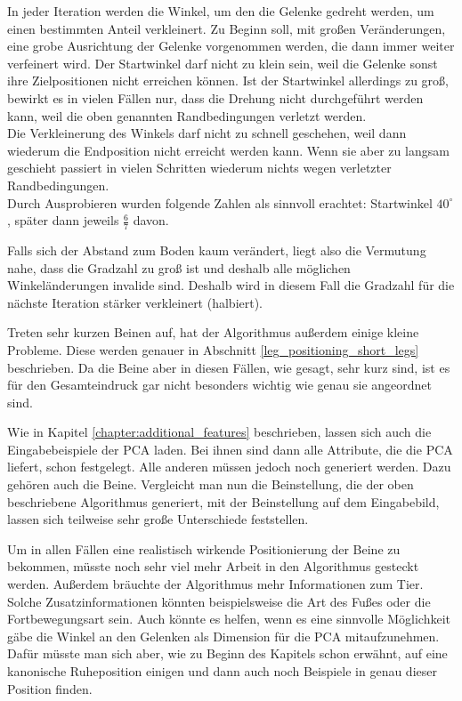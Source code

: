 In jeder Iteration werden die Winkel, um den die Gelenke gedreht werden, um einen bestimmten Anteil verkleinert. Zu Beginn soll, mit großen Veränderungen, eine grobe Ausrichtung der Gelenke vorgenommen werden, die dann immer weiter verfeinert wird.
Der Startwinkel darf nicht zu klein sein, weil die Gelenke sonst ihre Zielpositionen nicht erreichen können. Ist der Startwinkel allerdings zu groß, bewirkt es in vielen Fällen nur, dass die Drehung nicht durchgeführt werden kann, weil die oben genannten Randbedingungen verletzt werden.\\
Die Verkleinerung des Winkels darf nicht zu schnell geschehen, weil dann wiederum die Endposition nicht erreicht werden kann. Wenn sie aber zu langsam geschieht passiert in vielen Schritten wiederum nichts wegen verletzter Randbedingungen.\\
Durch Ausprobieren wurden folgende Zahlen als sinnvoll erachtet: Startwinkel $40^{\circ}$, später dann jeweils $\frac{6}{7}$ davon.

Falls sich der Abstand zum Boden kaum verändert, liegt also die Vermutung nahe, dass die Gradzahl zu groß ist und deshalb alle möglichen Winkeländerungen invalide sind. Deshalb wird in diesem Fall die Gradzahl für die nächste Iteration stärker verkleinert (halbiert).


Treten sehr kurzen Beinen auf, hat der Algorithmus außerdem einige kleine Probleme. Diese werden genauer in Abschnitt \ref{leg_positioning_short_legs} beschrieben. Da die Beine aber in diesen Fällen, wie gesagt, sehr kurz sind, ist es für den Gesamteindruck gar nicht besonders wichtig wie genau sie angeordnet sind.

Wie in Kapitel \ref{chapter:additional_features} beschrieben, lassen sich auch die Eingabebeispiele der PCA laden. Bei ihnen sind dann alle Attribute, die die PCA liefert, schon festgelegt. Alle anderen müssen jedoch noch generiert werden.
Dazu gehören auch die Beine.
Vergleicht man nun die Beinstellung, die der oben beschriebene Algorithmus generiert, mit der Beinstellung auf dem Eingabebild, lassen sich teilweise sehr große Unterschiede feststellen. 

Um in allen Fällen eine realistisch wirkende Positionierung der Beine zu bekommen, müsste noch sehr viel mehr Arbeit in den Algorithmus gesteckt werden. Außerdem bräuchte der Algorithmus mehr Informationen zum Tier. Solche Zusatzinformationen könnten beispielsweise die Art des Fußes oder die Fortbewegungsart sein. Auch könnte es helfen, wenn es eine sinnvolle Möglichkeit gäbe die Winkel an den Gelenken als Dimension für die PCA mitaufzunehmen. Dafür müsste man sich aber, wie zu Beginn des Kapitels schon erwähnt, auf eine kanonische Ruheposition einigen und dann auch noch Beispiele in genau dieser Position finden.

